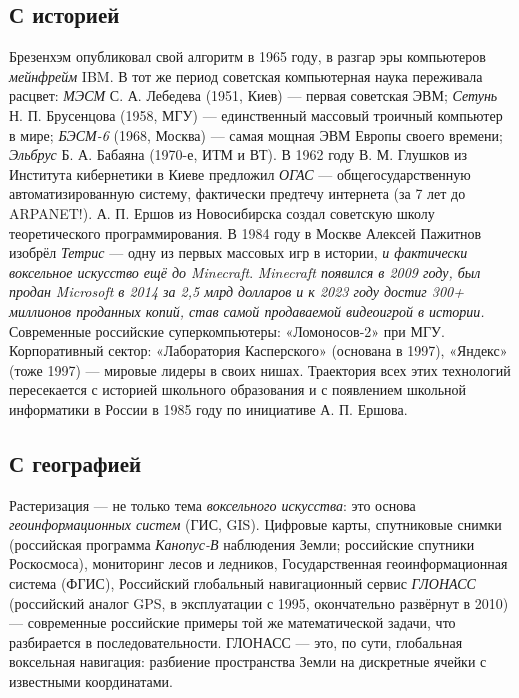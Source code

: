 \documentclass[12pt,a4paper]{scrartcl}
\begin{document}
\subsection{С историей}
Брезенхэм опубликовал свой алгоритм в 1965 году, в разгар эры компьютеров \emph{мейнфрейм} IBM. В тот же период советская компьютерная наука переживала расцвет: \emph{МЭСМ} С. А. Лебедева (1951, Киев) --- первая советская ЭВМ; \emph{Сетунь} Н. П. Брусенцова (1958, МГУ) --- единственный массовый троичный компьютер в мире; \emph{БЭСМ-6} (1968, Москва) --- самая мощная ЭВМ Европы своего времени; \emph{Эльбрус} Б. А. Бабаяна (1970-е, ИТМ и ВТ). В 1962 году В. М. Глушков из Института кибернетики в Киеве предложил \emph{ОГАС} --- общегосударственную автоматизированную систему, фактически предтечу интернета (за 7 лет до ARPANET!). А. П. Ершов из Новосибирска создал советскую школу теоретического программирования. В 1984 году в Москве Алексей Пажитнов изобрёл \emph{Тетрис} --- одну из первых массовых игр в истории, \emph{и фактически воксельное искусство ещё до Minecraft}. \emph{Minecraft появился в 2009 году, был продан Microsoft в 2014 за 2{,}5 млрд долларов и к 2023 году достиг 300+ миллионов проданных копий, став самой продаваемой видеоигрой в истории.} Современные российские суперкомпьютеры: «Ломоносов-2» при МГУ. Корпоративный сектор: «Лаборатория Касперского» (основана в 1997), «Яндекс» (тоже 1997) --- мировые лидеры в своих нишах. Траектория всех этих технологий пересекается с историей школьного образования и с появлением школьной информатики в России в 1985 году по инициативе А. П. Ершова.

\subsection{С географией}
Растеризация --- не только тема \emph{воксельного искусства}: это основа \emph{геоинформационных систем} (ГИС, GIS). Цифровые карты, спутниковые снимки (российская программа \emph{Канопус-В} наблюдения Земли; российские спутники Роскосмоса), мониторинг лесов и ледников, Государственная геоинформационная система (ФГИС), Российский глобальный навигационный сервис \emph{ГЛОНАСС} (российский аналог GPS, в эксплуатации с 1995, окончательно развёрнут в 2010) --- современные российские примеры той же математической задачи, что разбирается в последовательности. ГЛОНАСС --- это, по сути, глобальная воксельная навигация: разбиение пространства Земли на дискретные ячейки с известными координатами.
\end{document}
